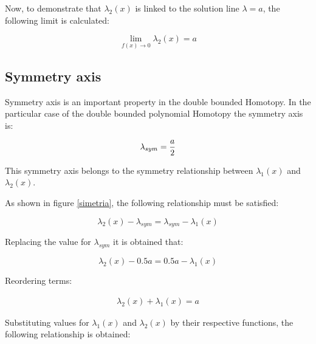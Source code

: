 \documentclass[journal,twocolumn]{IEEEtran}
\begin{document}
Now, to demonstrate that $\lambda_2(x)$ is linked to the solution line $\lambda=a$, the following limit is calculated:

\begin{equation}
 \displaystyle\lim_{f(x) \to{0}}{\lambda_2(x)}=a 
 \label{demos2x}
\end{equation}



\subsection{Symmetry axis}

Symmetry axis is an important property in the double bounded Homotopy. In the particular case of the double bounded polynomial Homotopy the symmetry axis is:

\begin{equation}
\lambda_{sym}= {a \over 2}
\label{sym}
\end{equation}

This symmetry axis belongs to the symmetry relationship between $\lambda_1(x)$ and $\lambda_2(x)$.

As shown in figure \ref{simetria}, the following relationship must be satisfied:

\begin{displaymath}
\lambda_2(x)-\lambda_{sym}=\lambda_{sym} -\lambda_1(x)
\end{displaymath}

Replacing the value for $\lambda_{sym}$ it is obtained that:

\begin{displaymath}
\lambda_2(x)-0.5a=0.5a-\lambda_1(x)
\end{displaymath}

Reordering terms:

\begin{displaymath}
\begin{array}{l}
\lambda_2(x)+\lambda_1(x)=a
\end{array}
\end{displaymath}

Substituting values for $\lambda_1(x)$ and $\lambda_2(x)$ by their respective functions, the following relationship is obtained:
\end{document}

